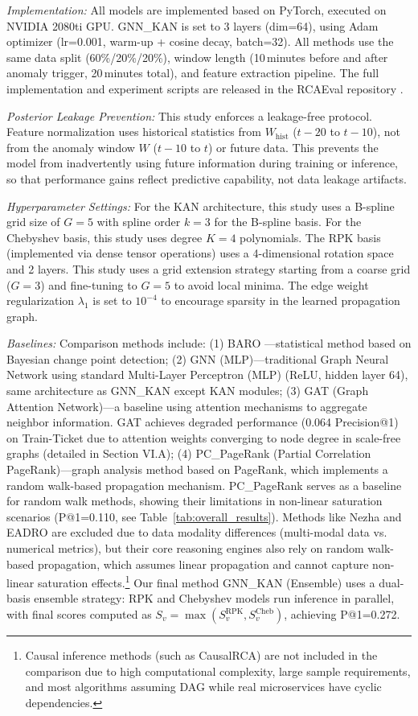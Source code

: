 \documentclass[conference]{IEEEtran}
\begin{document}
\textit{Implementation:} All models are implemented based on PyTorch, executed on NVIDIA 2080ti GPU. GNN\_KAN is set to 3 layers (dim=64), using Adam optimizer (lr=0.001, warm-up + cosine decay, batch=32). All methods use the same data split (60\%/20\%/20\%), window length (10\,minutes before and after anomaly trigger, 20\,minutes total), and feature extraction pipeline. The full implementation and experiment scripts are released in the RCAEval repository \cite{rcaeval}. 

\textit{Posterior Leakage Prevention:} This study enforces a leakage-free protocol. Feature normalization uses historical statistics from $W_{\text{hist}}$ ($t-20$ to $t-10$), not from the anomaly window $W$ ($t-10$ to $t$) or future data. This prevents the model from inadvertently using future information during training or inference, so that performance gains reflect predictive capability, not data leakage artifacts. 

\textit{Hyperparameter Settings:} For the KAN architecture, this study uses a B-spline grid size of $G=5$ with spline order $k=3$ for the B-spline basis. For the Chebyshev basis, this study uses degree $K=4$ polynomials. The RPK basis (implemented via dense tensor operations) uses a 4-dimensional rotation space and 2 layers. This study uses a grid extension strategy starting from a coarse grid ($G=3$) and fine-tuning to $G=5$ to avoid local minima. The edge weight regularization $\lambda_1$ is set to $10^{-4}$ to encourage sparsity in the learned propagation graph.

\textit{Baselines:} Comparison methods include: (1) BARO \cite{baro2023}---statistical method based on Bayesian change point detection; (2) GNN (MLP)---traditional Graph Neural Network using standard Multi-Layer Perceptron (MLP) (ReLU, hidden layer 64), same architecture as GNN\_KAN except KAN modules; (3) GAT (Graph Attention Network)---a baseline using attention mechanisms to aggregate neighbor information. GAT achieves degraded performance (0.064 Precision@1) on Train-Ticket due to attention weights converging to node degree in scale-free graphs (detailed in Section VI.A); (4) PC\_PageRank (Partial Correlation PageRank)---graph analysis method based on PageRank, which implements a random walk-based propagation mechanism. PC\_PageRank serves as a baseline for random walk methods, showing their limitations in non-linear saturation scenarios (P@1=0.110, see Table~\ref{tab:overall_results}). Methods like Nezha and EADRO are excluded due to data modality differences (multi-modal data vs. numerical metrics), but their core reasoning engines also rely on random walk-based propagation, which assumes linear propagation and cannot capture non-linear saturation effects.\footnote{Causal inference methods (such as CausalRCA) are not included in the comparison due to high computational complexity, large sample requirements, and most algorithms assuming DAG while real microservices have cyclic dependencies.} Our final method GNN\_KAN (Ensemble) uses a dual-basis ensemble strategy: RPK and Chebyshev models run inference in parallel, with final scores computed as $S_v = \max(S_v^{\text{RPK}}, S_v^{\text{Cheb}})$, achieving P@1=0.272.
\end{document}
